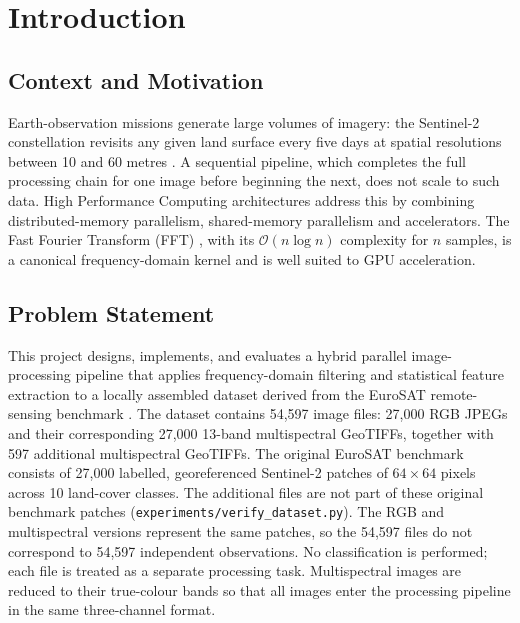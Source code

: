 \documentclass[a4paper,12pt]{report}
\begin{document}
\chapter{Introduction}
\label{chap:intro}

\section{Context and Motivation}
\label{sec:context}

Earth-observation missions generate large volumes of imagery: the Sentinel-2
constellation revisits any given land surface every five days at spatial
resolutions between 10 and 60 metres \cite{drusch2012}. A sequential pipeline,
which completes the full processing chain for one image before beginning the
next, does not scale to such data. High Performance Computing architectures
address this by combining distributed-memory parallelism, shared-memory
parallelism and accelerators. The Fast Fourier Transform (FFT)
\cite{cooley1965}, with its $\mathcal{O}(n\log n)$ complexity for $n$ samples, is
a canonical frequency-domain kernel and is well suited to GPU acceleration.

\section{Problem Statement}
\label{sec:problem}

This project designs, implements, and evaluates a hybrid parallel
image-processing pipeline that applies frequency-domain filtering and
statistical feature extraction to a locally assembled dataset derived from the
EuroSAT remote-sensing benchmark \cite{helber2019}. The dataset contains 54,597
image files: 27,000 RGB JPEGs and their corresponding 27,000 13-band multispectral
GeoTIFFs, together with 597 additional multispectral GeoTIFFs. The original EuroSAT
benchmark consists of 27,000 labelled, georeferenced Sentinel-2 patches of
$64\times64$ pixels across 10 land-cover classes. The additional files are not part
of these original benchmark patches
(\texttt{experiments\slash{}verify\_\discretionary{}{}{}dataset.py}).
The RGB and multispectral versions represent the same patches, so the 54,597 files
do not correspond to 54,597 independent observations. No classification is
performed; each file is treated as a separate processing task. Multispectral images
are reduced to their true-colour bands so that all images enter the processing
pipeline in the same three-channel format.
\end{document}
